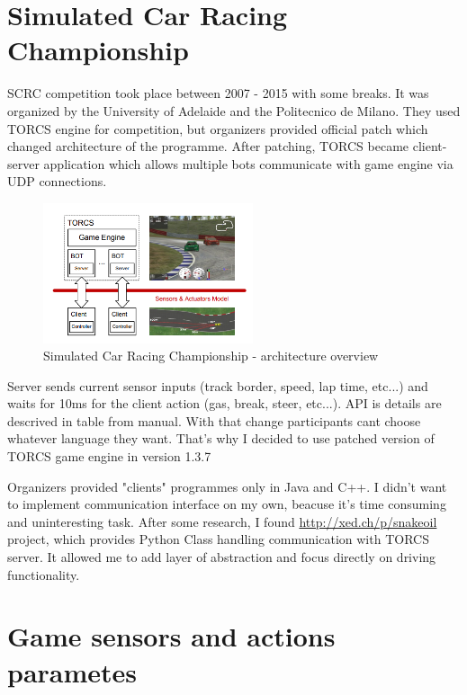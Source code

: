 \documentclass[declaration,shortabstract,english,inz]{iithesis}
\begin{document}
\section{Simulated Car Racing Championship}

SCRC competition took place between 2007 - 2015 with some breaks. It was organized by the University of Adelaide and the Politecnico de Milano. They used TORCS engine for competition, but organizers provided official patch which changed architecture of the programme. After patching, TORCS became client-server application which allows multiple bots communicate with game engine via UDP connections. 

\begin{figure}
    \includegraphics[width=0.55\textwidth]{img/scr_architecture.png}
    \caption{Simulated Car Racing Championship - architecture overview \cite{scrc_manual}}
    \label{fig:scrc_arc}
\end{figure}

Server sends current sensor inputs (track border, speed, lap time, etc...) and waits for 10ms for the client action (gas, break, steer, etc...). API is details are descrived in table from manual. With that change participants cant choose whatever language they want. That's why I decided to use patched version of TORCS game engine in version 1.3.7

Organizers provided "clients" programmes only in Java and C++. I didn't want to implement communication interface on my own, beacuse it's time consuming  and uninteresting task. After some research,  I found \url{http://xed.ch/p/snakeoil} project, which provides Python Class handling communication with TORCS server. It allowed me to add layer of abstraction and focus directly on driving functionality.

\section{Game sensors and actions parametes}
    
\end{document}
